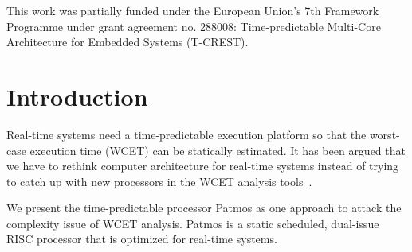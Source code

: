 \documentclass[a4paper,fontsize=10pt,twoside,DIV15,BCOR12mm,headinclude=true,footinclude=false,pagesize,bibtotoc]{scrbook}
\newcommand{\comment}[3]{

\textsf{\textbf{#1}} {\color{#3}#2}}
\newcommand{\martin}[1]{\comment{Martin}{#1}{Blue}}
\newcommand{\fb}[1]{\comment{Florian}{#1}{Emerald}}
\renewcommand{\martin}[1]{}
\renewcommand{\fb}[1]{}
\begin{document}
This work was partially funded under the
European Union's 7th Framework Programme
under grant agreement no. 288008:
Time-predictable Multi-Core Architecture for Embedded
Systems (T-CREST).

\tableofcontents

\begingroup
\let\cleardoublepage\clearpage
\listoffigures
\listoftables
\lstlistoflistings
\endgroup

\mainmatter

\chapter{Introduction}

Real-time systems need a time-predictable execution platform so that the worst-case execution time (WCET) can be statically estimated. It has been argued that we have to rethink computer architecture for real-time systems instead of trying to catch up with new processors in the WCET analysis tools~\cite{tpca:jes, pret:dac2007}.

We present the time-predictable processor Patmos as one approach to attack the complexity issue of WCET analysis. Patmos is a static scheduled, dual-issue RISC processor that is optimized for real-time systems.

\martin{This report shall converge towards a real manual. At the moment it serves
discussion well, but we shall keep this in mind. Here a starting list of TODOs:

\begin{itemize}
\item Send an email to all and ask about cleanup of some discussion points
\item Convert some discussion text into readable sections and argue why we
did what we did
\item Get a nice introduction and a good architecture section written
\end{itemize}

}



\fb{Martin wishes that Patmos will not require more than 3000 LC ;-)}
\martin{And fmax shall not be below 80\% of NIOS or MicroBlaze.
And performance (also average case ;-) shall be better, compared to NIOS/MB.
And we could compare against Tommy's YARI.}
\end{document}
